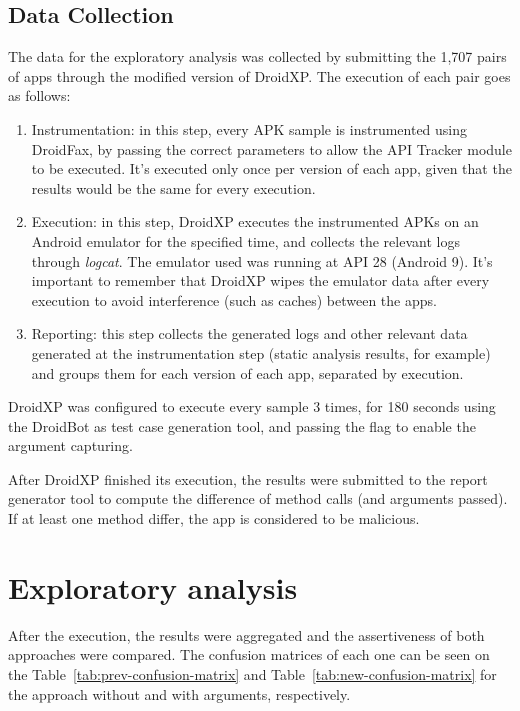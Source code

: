 \subsection{Data Collection}

The data for the exploratory analysis was collected by submitting the 1,707 pairs of apps through the modified version of DroidXP. The execution of each pair goes as follows:

\begin{enumerate}
    \item Instrumentation: in this step, every APK sample is instrumented using DroidFax, by passing the correct parameters to allow the API Tracker module to be executed. It's executed only once per version of each app, given that the results would be the same for every execution.
    \item Execution: in this step, DroidXP executes the instrumented APKs on an Android emulator for the specified time, and collects the relevant logs through \textit{logcat}. The emulator used was running at API 28 (Android 9). It's important to remember that DroidXP wipes the emulator data after every execution to avoid interference (such as caches) between the apps.
    \item Reporting: this step collects the generated logs and other relevant data generated at the instrumentation step (static analysis results, for example) and groups them for each version of each app, separated by execution.
\end{enumerate}

DroidXP was configured to execute every sample 3 times, for 180 seconds using the DroidBot as test case generation tool, and passing the  flag to enable the argument capturing.

After DroidXP finished its execution, the results were submitted to the report generator tool to compute the difference of method calls (and arguments passed). If at least one method differ, the app is considered to be malicious.

\section{Exploratory analysis}

After the execution, the results were aggregated and the assertiveness of both approaches were compared. The confusion matrices of each one can be seen on the Table~\ref{tab:prev-confusion-matrix} and Table~\ref{tab:new-confusion-matrix} for the approach without and with arguments, respectively.

